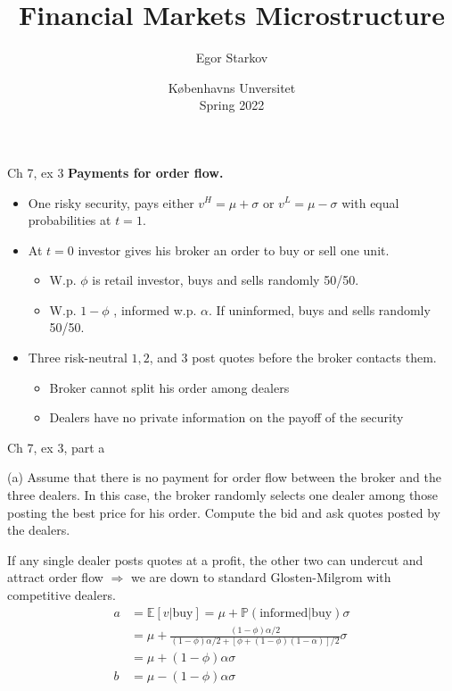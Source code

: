 \documentclass[english,10pt
,aspectratio=169
]{beamer}
\title{Financial Markets Microstructure}
\author{Egor Starkov}
\date{K{\o}benhavns Unversitet \\
	Spring 2022}
\begin{document}
	

\begin{frame}{Ch 7, ex 3}
	\textbf{Payments for order flow. }
	\begin{itemize}
		\item One risky security, pays either $v^{H}=\mu +\sigma $ or $v^{L}=\mu -\sigma $ with equal probabilities at $t=1$.
		\item At $t=0$ investor gives his broker an order to buy or sell one unit.
		\begin{itemize}
			\item W.p. $\phi$  is retail investor, buys and sells randomly 50/50.
			\item W.p. $1-\phi$ , \alert{informed} w.p. $\alpha$. If uninformed, buys and sells randomly 50/50.
		\end{itemize}
		\item Three risk-neutral  $1,2$, and $3$ post quotes before the broker contacts them.
		\begin{itemize}
			\item Broker cannot split his order among dealers
			\item Dealers have no private information on the payoff of the security
		\end{itemize}
	\end{itemize}
\end{frame}


\begin{frame}{Ch 7, ex 3, part a}
	\begin{exampleblock}{}
		(a) Assume that there is no payment for order flow between the
		broker and the three dealers. In this case, the broker randomly selects one
		dealer among those posting the best price for his order. Compute the bid and
		ask quotes posted by the dealers.
	\end{exampleblock}
	
	\pause
	
	If any single dealer posts quotes at a profit, the other two can undercut and attract order flow $\Rightarrow$ we are down to standard Glosten-Milgrom with competitive dealers.
	\begin{align*}
		a &= \mathbb{E}[v|\text{buy}] = \mu + \mathbb{P}(\text{informed}|\text{buy}) \sigma
		\\
		&= \mu + \frac{(1-\phi)\alpha/2}{(1-\phi)\alpha/2 + \left[\phi+(1-\phi)(1-\alpha) \right]/2} \sigma
		\\
		&= \mu + (1-\phi)\alpha \sigma
		\\
		b &= \mu - (1-\phi)\alpha \sigma
	\end{align*}
\end{frame}
\end{document}
